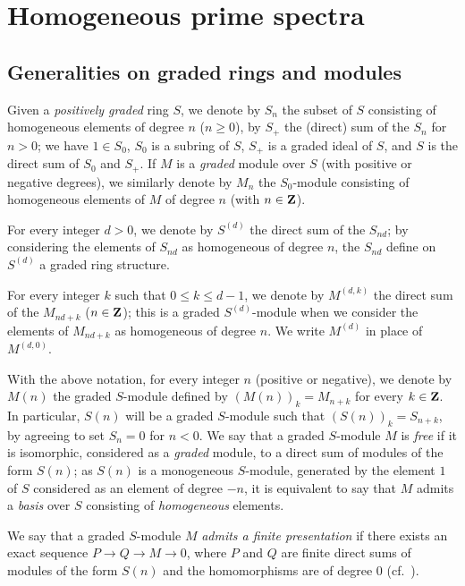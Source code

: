 \section{Homogeneous prime spectra}
\label{section:II.2}

\subsection{Generalities on graded rings and modules}
\label{subsection:II.2.1}

\begin{notation}[2.1.1]
\label{II.2.1.1}
Given a \emph{positively graded} ring $S$, we denote by $S_n$ the subset of $S$ consisting of homogeneous elements of degree $n$ ($n\geq 0$), by $S_+$ the (direct) sum of the $S_n$ for $n>0$;
we have $1\in S_0$, $S_0$ is a subring of $S$, $S_+$ is a graded ideal of $S$, and $S$ is the direct sum of $S_0$ and $S_+$.
If $M$ is a \emph{graded} module over $S$ (with positive or negative degrees), we similarly denote by $M_n$ the $S_0$-module consisting of homogeneous elements of $M$ of degree $n$ (with $n\in\mathbf{Z}$).

For every integer $d>0$, we denote by $S^{(d)}$ the direct sum of the $S_{nd}$;
by considering the elements of $S_{nd}$ as homogeneous of degree $n$, the $S_{nd}$ define on $S^{(d)}$ a graded ring structure.

For every integer $k$ such that $0\leq k\leq d-1$, we denote by $M^{(d,k)}$ the direct sum
of the $M_{nd+k}$ ($n\in\mathbf{Z}$);
this is a graded $S^{(d)}$-module when we consider the elements of $M_{nd+k}$ as homogeneous of degree $n$.
We write $M^{(d)}$ in place of $M^{(d,0)}$.

With the above notation, for every integer $n$ (positive or negative), we denote by $M(n)$ the graded $S$-module defined by $(M(n))_k=M_{n+k}$ for every $k\in\mathbf{Z}$.
In particular, $S(n)$ will be a graded $S$-module such that $(S(n))_k=S_{n+k}$, by agreeing to set $S_n=0$ for $n<0$.
We say that a graded $S$-module $M$ is \emph{free} if it is isomorphic, considered as a \emph{graded} module, to a direct sum of modules of the form $S(n)$;
as $S(n)$ is a monogeneous $S$-module, generated by the element $1$ of $S$ considered as an element of degree $-n$, it is equivalent to say that $M$ admits a \emph{basis} over $S$ consisting of \emph{homogeneous} elements.

We say that a graded $S$-module $M$ \emph{admits a finite presentation} if there exists an exact sequence $P\to Q\to M\to 0$, where $P$ and $Q$ are finite direct sums of modules of the form $S(n)$ and the homomorphisms are of degree $0$ (cf.~).
\end{notation}

